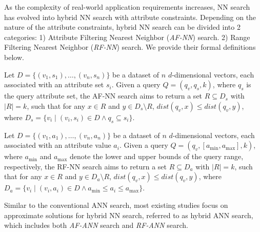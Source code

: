 \documentclass[sigconf, nonacm]{acmart}
\begin{document}
	As the complexity of real-world application requirements increases, NN search has evolved into hybrid NN search with attribute constraints. Depending on the nature of the attribute constraints, hybrid NN search can be divided into 2 categories: 1) Attribute Filtering Nearest Neighbor (\textit{AF-NN}) search. 2) Range Filtering Nearest Neighbor (\textit{RF-NN}) search. We provide their formal definitions below.
	
	\begin{definition}[AF-NN Search]
		Let \( D = \{(v_1, s_1), \ldots, (v_n, s_n)\} \) be a dataset of \( n \) \( d \)-dimensional vectors, each associated with an attribute set \( s_i \). Given a query \( Q = (q_v, q_s, k) \), where \( q_s \) is the query attribute set, the AF-NN search aims to return a set \( R \subseteq D_s \) with \( |R| = k \), such that for any \( x \in R \) and \( y \in D_s \setminus R \), \( \textit{dist}(q_v, x) \leq \textit{dist}(q_v, y) \), where \( D_s = \{ v_i \mid (v_i, s_i) \in D \land q_s \subseteq s_i \} \).
	\end{definition}
	
	
	\begin{definition}[RF-NN Search]
		
		Let \( D = \{(v_1, a_1), \ldots, (v_n, a_n)\} \) be a dataset of \( n \) \( d \)-dimensional vectors, each associated with an attribute value \( a_i \). Given a query \( Q = (q_v, [a_{\min}, a_{\max}], k) \), where \( a_{\min} \) and \( a_{\max} \) denote the lower and upper bounds of the query range, respectively, the RF-NN search aims to return a set \( R \subseteq D_a \) with \( |R| = k \), such that for any \( x \in R \) and \( y \in D_a \setminus R \), \( \textit{dist}(q_v, x) \leq \textit{dist}(q_v, y) \), where \( D_a = \{ v_i \mid (v_i, a_i) \in D \land a_{\min} \leq a_i \leq a_{\max} \} \).
	\end{definition}
	
	
	
	Similar to the conventional ANN search, most existing studies focus on approximate solutions for hybrid NN search, referred to as hybrid ANN search, which includes both \textit{AF-ANN} search and \textit{RF-ANN} search.
	
\end{document}
